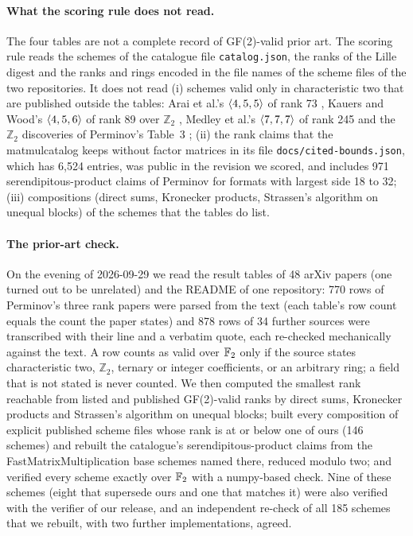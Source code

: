 \paragraph{What the scoring rule does not read.}
The four tables are not a complete record of GF(2)-valid prior art. The scoring rule reads the schemes of the catalogue file \texttt{catalog.json}, the ranks of the Lille digest and the ranks and rings encoded in the file names of the scheme files of the two repositories. It does not read
(i) schemes valid only in characteristic two that are published outside the tables: Arai et al.'s $\langle 4,5,5\rangle$ of rank 73 \cite{arai2024adaptive}, Kauers and Wood's $\langle 4,5,6\rangle$ of rank 89 over $\mathbb Z_2$ \cite{kauers2025meta}, Medley et al.'s $\langle 7,7,7\rangle$ of rank 245 \cite{medley2026gpu} and the $\mathbb Z_2$ discoveries of Perminov's Table~3 \cite{perminov2025ternary};
(ii) the rank claims that the matmulcatalog keeps without factor matrices in its file \texttt{docs/cited-bounds.json}, which has 6{,}524 entries, was public in the revision we scored, and includes 971 serendipitous-product claims of Perminov \cite{perminov2026serendipitous} for formats with largest side 18 to 32;
(iii) compositions (direct sums, Kronecker products, Strassen's algorithm on unequal blocks) of the schemes that the tables do list.

\paragraph{The prior-art check.}
On the evening of 2026-09-29 we read the result tables of 48 arXiv papers (one turned out to be unrelated) and the README of one repository: 770 rows of Perminov's three rank papers were parsed from the text (each table's row count equals the count the paper states) and 878 rows of 34 further sources were transcribed with their line and a verbatim quote, each re-checked mechanically against the text. A row counts as valid over ${\mathbb{F}_2}$ only if the source states characteristic two, $\mathbb Z_2$, ternary or integer coefficients, or an arbitrary ring; a field that is not stated is never counted.
We then computed the smallest rank reachable from listed and published GF(2)-valid ranks by direct sums, Kronecker products and Strassen's algorithm on unequal blocks; built every composition of explicit published scheme files whose rank is at or below one of ours (146 schemes) and rebuilt the catalogue's serendipitous-product claims from the FastMatrixMultiplication base schemes named there, reduced modulo two; and verified every scheme exactly over ${\mathbb{F}_2}$ with a numpy-based check. Nine of these schemes (eight that supersede ours and one that matches it) were also verified with the verifier of our release, and an independent re-check of all 185 schemes that we rebuilt, with two further implementations, agreed.

